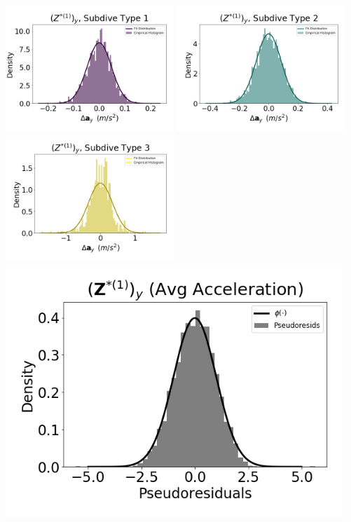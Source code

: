 \documentclass[12pt]{TD-CJS}
\begin{document}
\newpage

\includegraphics[width=2.5in]{../Plots/empirical_hist_Ay_0.png}
\includegraphics[width=2.5in]{../Plots/empirical_hist_Ay_1.png}
\includegraphics[width=2.5in]{../Plots/empirical_hist_Ay_2.png}
\includegraphics[width=5in]{../Plots/psedoresids_Ay.png}
\end{document}
